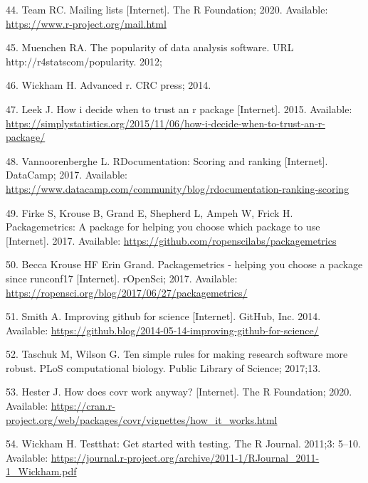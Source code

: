 \documentclass[10pt,letterpaper]{article}
\begin{document}
\leavevmode\hypertarget{ref-Rmail2020}{}%
44. Team RC. Mailing lists {[}Internet{]}. The R Foundation; 2020.
Available: \url{https://www.r-project.org/mail.html}

\leavevmode\hypertarget{ref-muenchen2012}{}%
45. Muenchen RA. The popularity of data analysis software. URL
http://r4statscom/popularity. 2012;

\leavevmode\hypertarget{ref-wickham2014}{}%
46. Wickham H. Advanced r. CRC press; 2014.

\leavevmode\hypertarget{ref-leek2015}{}%
47. Leek J. How i decide when to trust an r package {[}Internet{]}.
2015. Available:
\url{https://simplystatistics.org/2015/11/06/how-i-decide-when-to-trust-an-r-package/}

\leavevmode\hypertarget{ref-vannoorenberghe2017}{}%
48. Vannoorenberghe L. RDocumentation: Scoring and ranking
{[}Internet{]}. DataCamp; 2017. Available:
\url{https://www.datacamp.com/community/blog/rdocumentation-ranking-scoring}

\leavevmode\hypertarget{ref-packagemetrics}{}%
49. Firke S, Krouse B, Grand E, Shepherd L, Ampeh W, Frick H.
Packagemetrics: A package for helping you choose which package to use
{[}Internet{]}. 2017. Available:
\url{https://github.com/ropenscilabs/packagemetrics}

\leavevmode\hypertarget{ref-packagemetricsblog}{}%
50. Becca Krouse HF Erin Grand. Packagemetrics - helping you choose a
package since runconf17 {[}Internet{]}. rOpenSci; 2017. Available:
\url{https://ropensci.org/blog/2017/06/27/packagemetrics/}

\leavevmode\hypertarget{ref-smith2014}{}%
51. Smith A. Improving github for science {[}Internet{]}. GitHub, Inc.
2014. Available:
\url{https://github.blog/2014-05-14-improving-github-for-science/}

\leavevmode\hypertarget{ref-taschuk2017}{}%
52. Taschuk M, Wilson G. Ten simple rules for making research software
more robust. PLoS computational biology. Public Library of Science;
2017;13.

\leavevmode\hypertarget{ref-hester2020}{}%
53. Hester J. How does covr work anyway? {[}Internet{]}. The R
Foundation; 2020. Available:
\url{https://cran.r-project.org/web/packages/covr/vignettes/how_it_works.html}

\leavevmode\hypertarget{ref-wickham2011}{}%
54. Wickham H. Testthat: Get started with testing. The R Journal.
2011;3: 5--10. Available:
\url{https://journal.r-project.org/archive/2011-1/RJournal_2011-1_Wickham.pdf}
\end{document}
